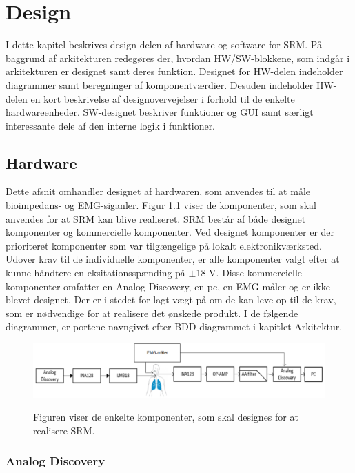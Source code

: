 \chapter{Design}

I dette kapitel beskrives design-delen af hardware og software for SRM. På baggrund af arkitekturen redegøres der, hvordan HW/SW-blokkene, som indgår i arkitekturen er designet samt deres funktion. Designet for HW-delen indeholder diagrammer samt beregninger af komponentværdier. Desuden indeholder HW-delen en kort
beskrivelse af designovervejelser i forhold til de enkelte hardwareenheder. SW-designet beskriver funktioner og GUI samt særligt interessante dele af den interne logik i funktioner. 


\section{Hardware}

Dette afsnit omhandler designet af hardwaren, som anvendes til at måle  bioimpedans- og EMG-siganler. Figur \ref{fig:Blokaede} viser de komponenter, som skal anvendes for at SRM kan blive realiseret. SRM består af både designet komponenter og kommercielle komponenter. Ved designet komponenter er der prioriteret komponenter som var tilgængelige på lokalt elektronikværksted. Udover krav til de individuelle komponenter, er alle komponenter valgt efter at kunne håndtere en eksitationsspænding på $\pm$18 V. Disse kommercielle komponenter omfatter en Analog Discovery, en pc, en EMG-måler og er ikke blevet designet. Der er i stedet for lagt vægt på om de kan leve op til de krav, som er nødvendige for at realisere det ønskede produkt. I de følgende diagrammer, er portene navngivet efter BDD diagrammet i kapitlet Arkitektur.


\begin{figure}[H]
\centering
{\includegraphics[width=\textwidth]
{Figure/Blokaede}}
\caption{Figuren viser de enkelte komponenter, som skal designes for at realisere SRM.}
\label{fig:Blokaede}
\end{figure}

\subsection{Analog Discovery}

